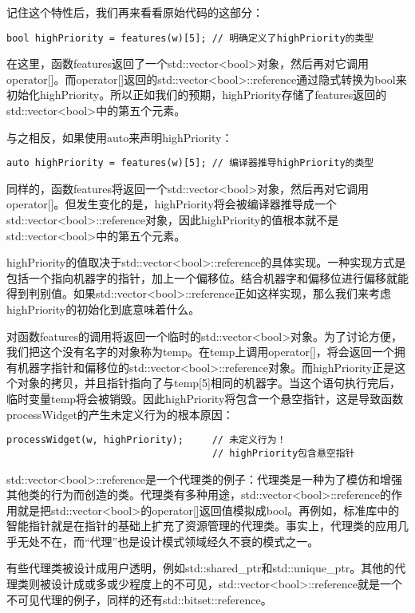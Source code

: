 记住这个特性后，我们再来看看原始代码的这部分：

\begin{lstlisting}
bool highPriority = features(w)[5]; // 明确定义了highPriority的类型
\end{lstlisting}

在这里，函数features返回了一个std::vector<bool>对象，然后再对它调用operator[]。而operator[]返回的std::vector<bool>::reference通过隐式转换为bool来初始化highPriority。所以正如我们的预期，highPriority存储了features返回的std::vector<bool>中的第五个元素。

与之相反，如果使用auto来声明highPriority：

\begin{lstlisting}
auto highPriority = features(w)[5]; // 编译器推导highPriority的类型
\end{lstlisting}


同样的，函数features将返回一个std::vector<bool>对象，然后再对它调用operator[]。但发生变化的是，highPriority将会被编译器推导成一个std::vector<bool>::reference对象，因此highPriority的值根本就不是std::vector<bool>中的第五个元素。

highPriority的值取决于std::vector<bool>::reference的具体实现。一种实现方式是包括一个指向机器字的指针，加上一个偏移位。结合机器字和偏移位进行偏移就能得到判别值。如果std::vector<bool>::reference正如这样实现，那么我们来考虑highPriority的初始化到底意味着什么。

对函数features的调用将返回一个临时的std::vector<bool>对象。为了讨论方便，我们把这个没有名字的对象称为temp。在temp上调用operator[]，将会返回一个拥有机器字指针和偏移位的std::vector<bool>::reference对象。而highPriority正是这个对象的拷贝，并且指针指向了与temp[5]相同的机器字。当这个语句执行完后，临时变量temp将会被销毁。因此highPriority将包含一个悬空指针，这是导致函数processWidget的产生未定义行为的根本原因：

\begin{lstlisting}
processWidget(w, highPriority);     // 未定义行为！
                                    // highPriority包含悬空指针
\end{lstlisting}

std::vector<bool>::reference是一个代理类的例子：代理类是一种为了模仿和增强其他类的行为而创造的类。代理类有多种用途，std::vector<bool>::reference的作用就是把std::vector<bool>的operator[]返回值模拟成bool。再例如，标准库中的智能指针就是在指针的基础上扩充了资源管理的代理类。事实上，代理类的应用几乎无处不在，而“代理”也是设计模式领域经久不衰的模式之一。

有些代理类被设计成用户透明，例如std::shared\_ptr和std::unique\_ptr。其他的代理类则被设计成或多或少程度上的不可见，std::vector<bool>::reference就是一个不可见代理的例子，同样的还有std::bitset::reference。

